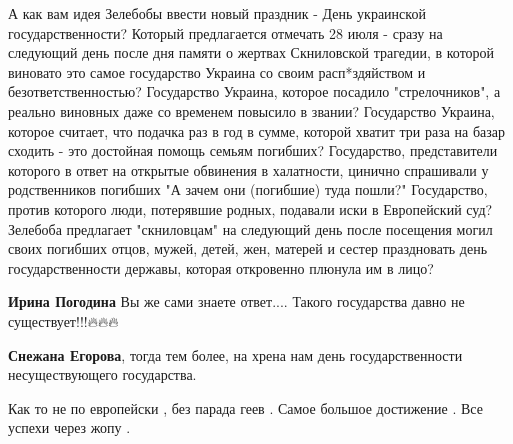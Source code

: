 \begin{itemize}
А как вам идея Зелебобы ввести новый праздник - День украинской
государственности? Который предлагается отмечать 28 июля - сразу на следующий
день после дня памяти о жертвах Скниловской трагедии, в которой виновато это
самое государство Украина со своим расп*здяйством и безответственностью?
Государство Украина, которое посадило "стрелочников", а реально виновных даже
со временем повысило в звании? Государство Украина, которое считает, что
подачка раз в год в сумме, которой хватит три раза на базар сходить - это
достойная помощь семьям погибших? Государство, представители которого в ответ
на открытые обвинения в халатности, цинично спрашивали у родственников погибших
"А зачем они (погибшие) туда пошли?" Государство, против которого люди,
потерявшие родных, подавали иски в Европейский суд? Зелебоба предлагает
"скниловцам" на следующий день после посещения могил своих погибших отцов,
мужей, детей, жен, матерей и сестер праздновать день государственности державы,
которая откровенно плюнула им в лицо?

\begin{itemize}
 
\textbf{Ирина Погодина} Вы же сами знаете ответ....
Такого государства давно не существует!!!🔥🔥🔥

 
\textbf{Снежана Егорова}, тогда тем более, на хрена нам день государственности несуществующего государства.
\end{itemize}

 
Как то не по европейски , без парада геев . Самое большое достижение . Все успехи через жопу .

 


\end{itemize}
